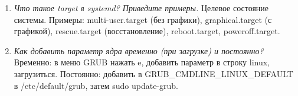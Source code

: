 \begin{enumerate}
	Команда journalctl -b.
	\item \textit{Что такое target в systemd? Приведите примеры.}\newline 
	Целевое состояние системы. Примеры: multi-user.target (без графики), graphical.target (с графикой), rescue.target (восстановление), reboot.target, poweroff.target.
	\item \textit{Как добавить параметр ядра временно (при загрузке) и постоянно?}\newline 
	Временно: в меню GRUB нажать e, добавить параметр в строку linux, загрузиться. Постоянно: добавить в GRUB\_CMDLINE\_LINUX\_DEFAULT в /etc/default/grub, затем sudo update-grub.
\end{enumerate}